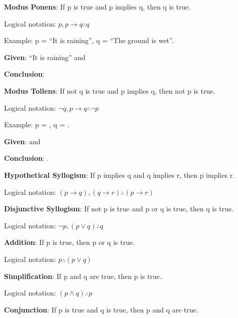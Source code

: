 \noindent \textbf{Modus Ponens}: If p is true and p implies q, then q is true.

Logical notation: \(p,p \rightarrow q \therefore q\)

Example: p = ``It is raining'', q = ``The ground is wet''.

\textbf{Given}: ``It is raining'' and 

\textbf{Conclusion}: 

\vspace{4 mm}

\textbf{Modus Tollens}: If not q is true and p implies q, then not p is true.

Logical notation: \(\neg q, p \rightarrow q \therefore \neg p\)

Example: p = , q = .

\textbf{Given}:  and 

\textbf{Conclusion}: .

\vspace{10 mm}

\textbf{Hypothetical Syllogism}: If p implies q and q implies r, then p implies r.

Logical notation: \((p \rightarrow q), (q \rightarrow r) \therefore (p \rightarrow r)\)

\vspace{4 mm}

\textbf{Disjunctive Syllogism}: If not p is true and p or q is true, then q is true.

Logical notation: \(\neg p, (p \vee q) \therefore q\)

\vspace{10 mm}

\textbf{Addition}: If p is true, then p or q is true.

Logical notation: \(p \therefore (p \vee q)\)

\vspace{4 mm}

\textbf{Simplification}: If p and q are true, then p is true.

Logical notation: \((p \wedge q) \therefore p\)

\vspace{4 mm}

\textbf{Conjunction}: If p is true and q is true, then p and q are true.

